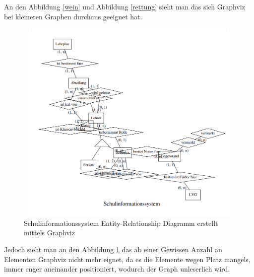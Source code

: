 \fib{}
\noindent
An den Abbildung \ref{wein} und Abbildung \ref{rettung} sieht man das sich Graphviz bei kleineren Graphen durchaus geeignet hat.

\begin{figure}[H]
	\begin{center}
		\includegraphics[width=16cm, height=10cm]{images/sis_neato.png}
		\caption{Schulinformationssystem Entity-Relationship Diagramm erstellt mittels Graphviz}
		\label{sis}
	\end{center}
\end{figure}
\noindent
Jedoch sieht man an den Abbildung \ref{sis} das ab einer Gewissen Anzahl an Elementen Graphviz nicht mehr eignet, da es die Elemente wegen Platz mangels, immer enger aneinander positioniert, wodurch der Graph unleserlich wird.